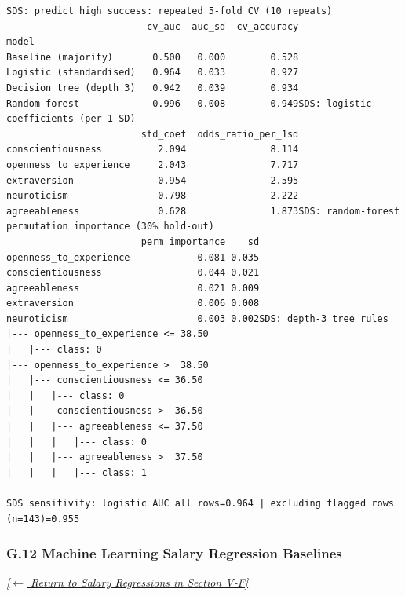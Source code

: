 \documentclass[conference]{IEEEtran}
\begin{document}
\begin{lstlisting}[style=outputstyle,caption={Execution Output G.11b: Senior Model CV and Decision Rules (Table V).},label={out:sds_models}]
SDS: predict high success: repeated 5-fold CV (10 repeats)
                         cv_auc  auc_sd  cv_accuracy
model                                               
Baseline (majority)       0.500   0.000        0.528
Logistic (standardised)   0.964   0.033        0.927
Decision tree (depth 3)   0.942   0.039        0.934
Random forest             0.996   0.008        0.949SDS: logistic coefficients (per 1 SD)
                        std_coef  odds_ratio_per_1sd
conscientiousness          2.094               8.114
openness_to_experience     2.043               7.717
extraversion               0.954               2.595
neuroticism                0.798               2.222
agreeableness              0.628               1.873SDS: random-forest permutation importance (30% hold-out)
                        perm_importance    sd
openness_to_experience            0.081 0.035
conscientiousness                 0.044 0.021
agreeableness                     0.021 0.009
extraversion                      0.006 0.008
neuroticism                       0.003 0.002SDS: depth-3 tree rules
|--- openness_to_experience <= 38.50
|   |--- class: 0
|--- openness_to_experience >  38.50
|   |--- conscientiousness <= 36.50
|   |   |--- class: 0
|   |--- conscientiousness >  36.50
|   |   |--- agreeableness <= 37.50
|   |   |   |--- class: 0
|   |   |--- agreeableness >  37.50
|   |   |   |--- class: 1

SDS sensitivity: logistic AUC all rows=0.964 | excluding flagged rows (n=143)=0.955
\end{lstlisting}

\subsubsection*{G.12 Machine Learning Salary Regression Baselines}
\label{lst:salary_reg}
\textit{\hyperref[sec:salary_model]{[$\leftarrow$ Return to Salary Regressions in Section V-F]}}
\end{document}
